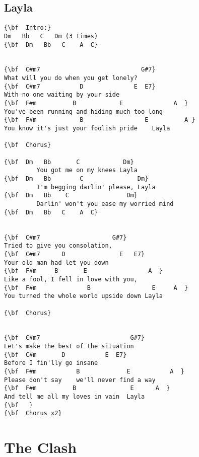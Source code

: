 \documentclass[a4paper]{article}
\begin{document}
\subsection{Layla}
\begin{Verbatim}[commandchars=\\\{\}]
{\bf  Intro:}
Dm   Bb   C   Dm (3 times) 
{\bf  Dm   Bb   C    A  C}


{\bf  C#m7                            G#7}
What will you do when you get lonely?
{\bf  C#m7           D              E  E7}
With no one waiting by your side
{\bf  F#m          B            E              A  }
You've been running and hiding much too long
{\bf  F#m            B                 E          A }
You know it's just your foolish pride    Layla

{\bf  Chorus}

{\bf  Dm   Bb       C            Dm}
         You got me on my knees Layla
{\bf  Dm   Bb        C               Dm}
         I'm begging darlin' please, Layla
{\bf  Dm   Bb    C                Dm}
         Darlin' won't you ease my worried mind
{\bf  Dm   Bb   C    A  C}


{\bf  C#m7                    G#7}
Tried to give you consolation,
{\bf  C#m7      D               E   E7}
Your old man had let you down
{\bf  F#m     B       E                 A  }
Like a fool, I fell in love with you,
{\bf  F#m              B                 E     A  }
You turned the whole world upside down Layla

{\bf  Chorus}


{\bf  C#m7                         G#7}
Let's make the best of the situation
{\bf  C#m       D           E  E7}
Before I fin'lly go insane
{\bf  F#m           B             E           A  }
Please don't say    we'll never find a way
{\bf  F#m          B               E      A  }
And tell me all my loves in vain  Layla
{\bf   }
{\bf  Chorus x2}

\end{Verbatim}
\newpage
\section{The Clash}
\end{document}
